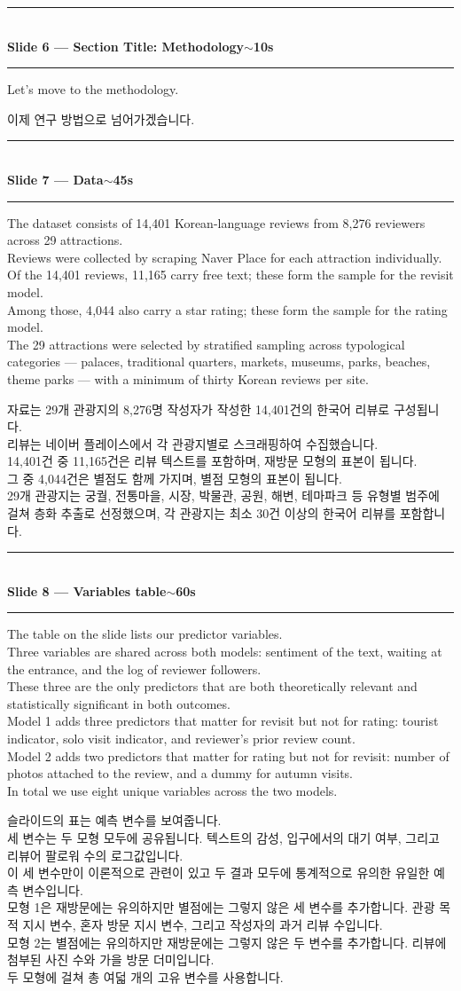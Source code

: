 \documentclass[10pt,a4paper]{article}
\newcommand{\sechead}[2]{%
  \vspace{6pt}%
  \noindent\rule{\linewidth}{0.6pt}\\[1pt]
  {\small\bfseries #1\hfill #2}\\[-3pt]
  \rule{\linewidth}{0.4pt}\par\vspace{2pt}%
}
\newcommand{\sent}[1]{#1\\[5pt]}
\newcommand{\bilingual}[2]{%
  \noindent%
  \begin{minipage}[t]{0.485\linewidth}
    \small #1
  \end{minipage}\hfill\vrule\hfill%
  \begin{minipage}[t]{0.483\linewidth}
    \small #2
  \end{minipage}\par\vspace{4pt}%
}
\begin{document}
\sechead{Slide 6 --- Section Title: Methodology}{$\sim$10s}

\bilingual{%
\sent{Let's move to the methodology.}
}{%
\sent{이제 연구 방법으로 넘어가겠습니다.}
}

\sechead{Slide 7 --- Data}{$\sim$45s}

\bilingual{%
\sent{The dataset consists of 14{,}401 Korean-language reviews from
8{,}276 reviewers across 29 attractions.}
\sent{Reviews were collected by scraping Naver Place for each attraction
individually.}
\sent{Of the 14{,}401 reviews, 11{,}165 carry free text; these form the
sample for the revisit model.}
\sent{Among those, 4{,}044 also carry a star rating; these form the
sample for the rating model.}
\sent{The 29 attractions were selected by stratified sampling across
typological categories --- palaces, traditional quarters, markets,
museums, parks, beaches, theme parks --- with a minimum of thirty
Korean reviews per site.}
}{%
\sent{자료는 29개 관광지의 8{,}276명 작성자가 작성한 14{,}401건의 한국어
리뷰로 구성됩니다.}
\sent{리뷰는 네이버 플레이스에서 각 관광지별로 스크래핑하여 수집했습니다.}
\sent{14{,}401건 중 11{,}165건은 리뷰 텍스트를 포함하며, 재방문 모형의
표본이 됩니다.}
\sent{그 중 4{,}044건은 별점도 함께 가지며, 별점 모형의 표본이 됩니다.}
\sent{29개 관광지는 궁궐, 전통마을, 시장, 박물관, 공원, 해변, 테마파크
등 유형별 범주에 걸쳐 층화 추출로 선정했으며, 각 관광지는 최소 30건
이상의 한국어 리뷰를 포함합니다.}
}

\sechead{Slide 8 --- Variables table}{$\sim$60s}

\bilingual{%
\sent{The table on the slide lists our predictor variables.}
\sent{Three variables are shared across both models: sentiment of the
text, waiting at the entrance, and the log of reviewer followers.}
\sent{These three are the only predictors that are both theoretically
relevant and statistically significant in both outcomes.}
\sent{Model 1 adds three predictors that matter for revisit but not for
rating: tourist indicator, solo visit indicator, and reviewer's prior
review count.}
\sent{Model 2 adds two predictors that matter for rating but not for
revisit: number of photos attached to the review, and a dummy for
autumn visits.}
\sent{In total we use eight unique variables across the two models.}
}{%
\sent{슬라이드의 표는 예측 변수를 보여줍니다.}
\sent{세 변수는 두 모형 모두에 공유됩니다. 텍스트의 감성, 입구에서의
대기 여부, 그리고 리뷰어 팔로워 수의 로그값입니다.}
\sent{이 세 변수만이 이론적으로 관련이 있고 두 결과 모두에 통계적으로
유의한 유일한 예측 변수입니다.}
\sent{모형 1은 재방문에는 유의하지만 별점에는 그렇지 않은 세 변수를
추가합니다. 관광 목적 지시 변수, 혼자 방문 지시 변수, 그리고 작성자의
과거 리뷰 수입니다.}
\sent{모형 2는 별점에는 유의하지만 재방문에는 그렇지 않은 두 변수를
추가합니다. 리뷰에 첨부된 사진 수와 가을 방문 더미입니다.}
\sent{두 모형에 걸쳐 총 여덟 개의 고유 변수를 사용합니다.}
}
\end{document}

